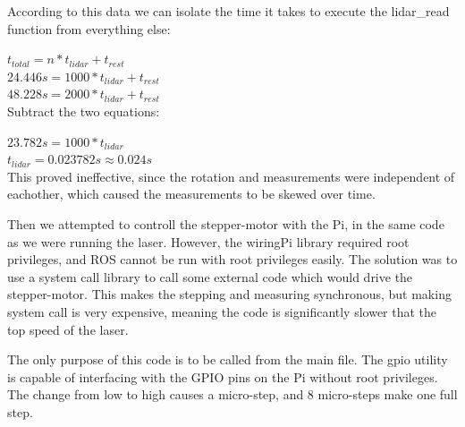According to this data we can isolate the time it takes to execute the lidar\_read function from everything else:

$t_{total} = n*t_{lidar} + t_{rest}$ \\

$24.446s = 1000*t_{lidar} + t_{rest}$ \\
$48.228s = 2000*t_{lidar} + t_{rest}$ \\

Subtract the two equations:

$23.782s = 1000*t_{lidar}$ \\
$t_{lidar} = 0.023782s \approx 0.024s$ \\


This proved ineffective, since the rotation and measurements were independent of eachother, which caused the measurements to be skewed over time.

Then we attempted to controll the stepper-motor with the Pi, in the same code as we were running the laser. However, the wiringPi library required root privileges, and ROS cannot be run with root privileges easily. The solution was to use a system call library to call some external code which would drive the stepper-motor. This makes the stepping and measuring synchronous, but making system call is very expensive, meaning the code is significantly slower that the top speed of the laser.




The only purpose of this code is to be called from the main file. The gpio utility is capable of interfacing with the GPIO pins on the Pi without root privileges. The change from low to high causes a micro-step, and 8 micro-steps make one full step.
